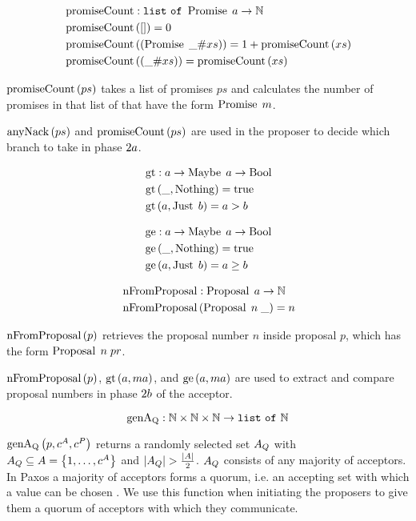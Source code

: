 \begin{align*}
&\operatorname{promiseCount} : \mathtt{list\ of\ } \operatorname{Promise}\; a \to \mathbb{N}\\
&\operatorname{promiseCount}\left(\mathtt{[]}\right) = 0\\
&\operatorname{promiseCount}\left(\left(\operatorname{Promise}\; \mathtt{\_} \mathtt{\#} xs\right)\right) = 1 + \operatorname{promiseCount}\left(xs\right)\\
&\operatorname{promiseCount}\left(\left(\mathtt{\_} \mathtt{\#} xs\right)\right) = \operatorname{promiseCount}\left(xs\right)
\end{align*}

$\operatorname{promiseCount}\left(ps\right)$ takes a list of promises $ps$ and calculates the number of promises in that list of that have the form $\operatorname{Promise}\; m$.

$\operatorname{anyNack}\left(ps\right)$ and $\operatorname{promiseCount}\left(ps\right)$ are used in the proposer to decide which branch to take in phase $2a$.

\begin{align*}    
&\operatorname{gt}: a \to \operatorname{Maybe}\; a \to \operatorname{Bool}\\
&\operatorname{gt}\left(\mathtt{\_}, \operatorname{Nothing}\right) = \operatorname{true}\\
&\operatorname{gt}\left(a, \operatorname{Just}\; b\right) = a > b
\end{align*}

\begin{align*}
&\operatorname{ge}: a \to \operatorname{Maybe}\; a \to \operatorname{Bool}\\
&\operatorname{ge}\left(\mathtt{\_}, \operatorname{Nothing}\right) = \operatorname{true}\\
&\operatorname{ge}\left(a, \operatorname{Just}\; b\right) = a \ge b
\end{align*}

\begin{align*}    
&\operatorname{nFromProposal} : \operatorname{Proposal}\; a \to \mathbb{N}\\
&\operatorname{nFromProposal}\left(\operatorname{Proposal}\; n\; \mathtt{\_} \right) = n
\end{align*}

$\operatorname{nFromProposal}\left(p \right)$ retrieves the proposal number $n$ inside proposal $p$, which has the form $\operatorname{Proposal}\; n\; pr$.

$\operatorname{nFromProposal}\left(p \right)$, $\operatorname{gt}\left(a, ma\right)$, and $\operatorname{ge}\left(a, ma\right)$ are used to extract and compare proposal numbers in phase $2b$ of the acceptor.

\[\operatorname{genA_Q} : \mathbb{N} \times \mathbb{N} \times \mathbb{N} \to \mathtt{list\ of\ } \mathbb{N}\]

$\operatorname{genA_Q}\left(p, c^A, c^P\right)$ returns a randomly selected set $A_Q$ with $A_Q \subseteq A = \left\{1, \dots, c^A\right\}$ and $|A_Q| > \frac{|A|}{2}$.
$A_Q$ consists of any majority of acceptors.
In Paxos a majority of acceptors forms a quorum, i.e. an accepting set with which a value can be chosen \cite{lower_bounds}.
We use this function when initiating the proposers to give them a quorum of acceptors with which they communicate.


